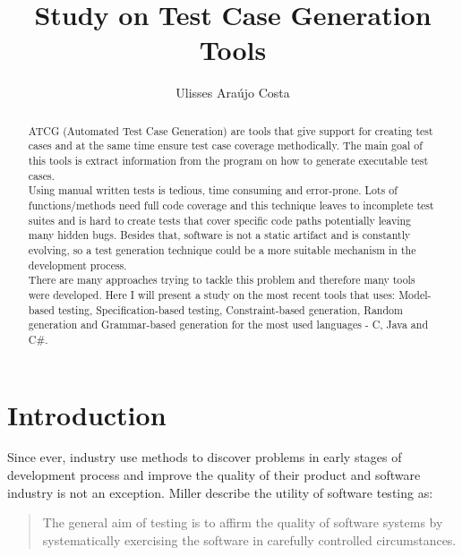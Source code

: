 \documentclass[citeauthoryear]{llncs}
\title{Study on Test Case Generation Tools}
\author{Ulisses Araújo Costa}
\institute{Department of Informatics, University of Minho\\ Campus de Gualtar, 4710-057 Braga, Portugal\\
\email{ulissesmonhecosta@gmail.com}
}
\begin{document}
\maketitle
\begin{abstract}
ATCG (Automated Test Case Generation) are tools that give support for creating test cases and at the same time ensure test case coverage methodically.
The main goal of this tools is extract information from the program on how to generate executable test cases.\\
Using  manual written tests is tedious, time consuming and error-prone. Lots of functions/methods need full code coverage and this technique leaves
to incomplete test suites and is hard to create tests that cover specific code paths potentially leaving many hidden bugs.
Besides that, software is not a static artifact and is constantly evolving, so a test generation technique could be a more suitable mechanism in the development process.\\
There are many approaches trying to tackle this problem and therefore many tools were developed. Here I will present a study on the most recent tools that uses:
Model-based testing, Specification-based testing, Constraint-based generation, Random generation and Grammar-based generation for the most used languages - C, Java and C\#.
\end{abstract}

\section{Introduction}
Since ever, industry use methods to discover problems in early stages of development process and improve
the quality of their product and software industry is not an exception. Miller\cite{miller} describe the utility
of software testing as:

\begin{quotation}
The general aim of testing is to affirm the quality of software systems by systematically
exercising the software in carefully controlled circumstances.
\end{quotation}
\end{document}
